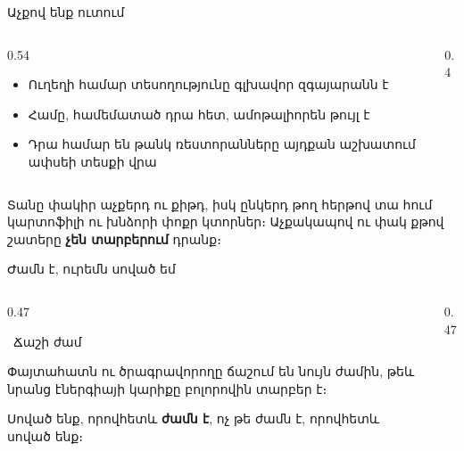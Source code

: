\begin{frame}{Աչքով ենք ուտում}
  \begin{columns}[c]
    \begin{column}{0.54\textwidth}
      \begin{itemize}
        \item Ուղեղի համար տեսողությունը գլխավոր զգայարանն է
        \item Համը, համեմատած դրա հետ, ամոթալիորեն թույլ է
        \item Դրա համար են թանկ ռեստորանները այդքան աշխատում ափսեի տեսքի վրա
      \end{itemize}
    \end{column}
    \begin{column}{0.4\textwidth}
      \centering
      \quad{}
    \end{column}
  \end{columns}
  \vspace{0.5mm}
  \begin{tryit}
    Տանը փակիր աչքերդ ու քիթդ, իսկ ընկերդ թող հերթով տա հում կարտոֆիլի ու խնձորի փոքր կտորներ։ Աչքակապով ու փակ քթով շատերը \textbf{չեն տարբերում} դրանք։
  \end{tryit}
\end{frame}

\begin{frame}{Ժամն է, ուրեմն սոված եմ}
  \begin{columns}[T]
    \begin{column}{0.47\textwidth}
      \begin{card}
        \ {\blackfont Ճաշի ժամ}\par\smallskip
        Փայտահատն ու ծրագրավորողը ճաշում են նույն ժամին, թեև նրանց էներգիայի կարիքը բոլորովին տարբեր է։\par\smallskip
        Սոված ենք, որովհետև \textbf{ժամն է}, ոչ թե ժամն է, որովհետև սոված ենք։
      \end{card}
    \end{column}
    \begin{column}{0.47\textwidth}
    \end{column}
  \end{columns}
\end{frame}

